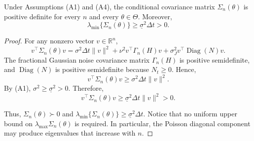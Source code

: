 \documentclass[10pt,a4paper]{amsart}
\begin{document}
\begin{lemma}
Under Assumptions (A1) and (A4), the conditional covariance matrix
$\Sigma_n(\theta)$ is positive definite for every
$n$ and every $\theta\in\Theta$. Moreover,
$$
\lambda_{\min}\{\Sigma_n(\theta)\}
\geq
\underline{\sigma}^2\Delta t>0.
$$
\end{lemma}

\begin{proof}
For any nonzero vector $v\in\mathbb{R}^n$,
$$
v^\top\Sigma_n(\theta)v
=\sigma^2\Delta t\|v\|^2
+ \nu^2v^\top\Gamma_n(H)v
+\sigma_J^2
v^\top\operatorname{Diag}(N)v.
$$
The fractional Gaussian noise covariance matrix $\Gamma_n(H)$ is positive semidefinite, and
$\operatorname{Diag}(N)$ is positive semidefinite because
$N_t\geq0$. Hence,
$$
v^\top\Sigma_n(\theta)v
\geq
\sigma^2\Delta t\|v\|^2.
$$
By (A1), $\sigma^2\geq\underline{\sigma}^2>0.$ Therefore, $$ v^\top\Sigma_n(\theta)v
\geq
\underline{\sigma}^2\Delta t\|v\|^2>0.
$$

Thus, $\Sigma_n(\theta)\succ0$
and  $
\lambda_{\min}\{\Sigma_n(\theta)\}
\geq
\underline{\sigma}^2\Delta t.
$
Notice that no uniform upper bound on
$\lambda_{\max}{\Sigma_n(\theta)}$ is required. In particular, the Poisson diagonal component may produce eigenvalues that increase with $n$.
\end{proof}
\end{document}
